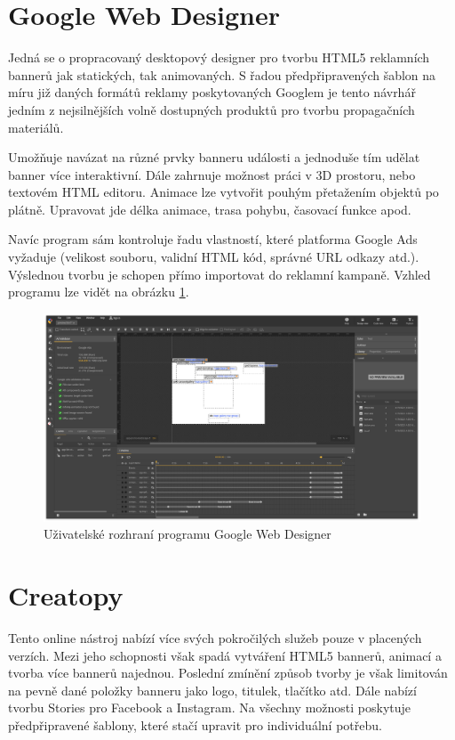 \section{Google Web Designer}
Jedná se o propracovaný desktopový designer pro tvorbu HTML5 reklamních bannerů jak statických, tak animovaných.
S řadou předpřipravených šablon na míru již daných formátů reklamy poskytovaných Googlem je tento návrhář jedním z nejsilnějších
volně dostupných produktů pro tvorbu propagačních materiálů.

Umožňuje navázat na různé prvky banneru události a jednoduše tím udělat banner více interaktivní.
Dále zahrnuje možnost práci v 3D prostoru, nebo textovém HTML editoru.
Animace lze vytvořit pouhým přetažením objektů po plátně. Upravovat jde délka animace, trasa pohybu, časovací funkce apod.

Navíc program sám kontroluje řadu vlastností, které platforma Google Ads vyžaduje
(velikost souboru, validní HTML kód, správné URL odkazy atd.). Výslednou tvorbu je schopen přímo importovat do reklamní kampaně.
Vzhled programu lze vidět na obrázku \ref{fig:web-designer}.

\begin{figure}
    \centering
    \includegraphics[width=.8\textwidth]{Figures/web-designer.png}
    \caption[Google Web Designer]{Uživatelské rozhraní programu Google Web Designer}
    \label{fig:web-designer}
\end{figure}

\section{Creatopy}
Tento online nástroj nabízí více svých pokročilých služeb pouze v placených verzích. Mezi jeho schopnosti však spadá vytváření HTML5 bannerů,
animací a tvorba více bannerů najednou. Poslední zmínění způsob tvorby je však limitován na pevně dané položky banneru jako logo, titulek,
tlačítko atd. Dále nabízí tvorbu Stories pro Facebook a Instagram. Na všechny možnosti poskytuje předpřipravené šablony,
které stačí upravit pro individuální potřebu.

